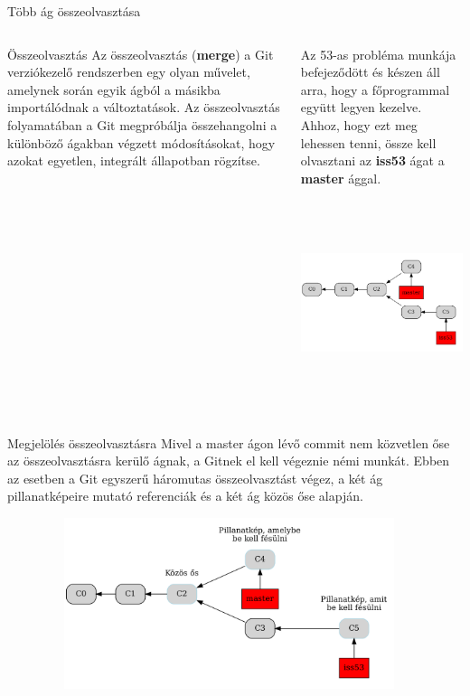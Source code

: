 \documentclass[english, aspectratio=169]{beamer}
\begin{document}
	\begin{frame}{Több ág összeolvasztása}
		\begin{columns}
			\begin{column}{0.4\textwidth}
				\begin{center}
					\begin{block}{Összeolvasztás}
						Az összeolvasztás (\textbf{merge}) a Git verziókezelő rendszerben egy olyan művelet, amelynek során egyik ágból a másikba importálódnak a változtatások. Az összeolvasztás folyamatában a Git megpróbálja összehangolni a különböző ágakban végzett módosításokat, hogy azokat egyetlen, integrált állapotban rögzítse.
					\end{block}
				\end{center}
			\end{column}
			\begin{column}{0.6\textwidth}
				Az 53-as probléma munkája befejeződött és készen áll arra, hogy a főprogrammal együtt legyen kezelve. Ahhoz, hogy ezt meg lehessen tenni, össze kell olvasztani az \textbf{iss53} ágat a \textbf{master} ággal.
				\begin{center}
					\includegraphics[height=6cm, width=8cm, keepaspectratio]{graphs/git_15.png}
				\end{center}
			\end{column}
		\end{columns}
	\end{frame}
	
	\begin{frame}{Megjelölés összeolvasztásra}
		Mivel a master ágon lévő commit nem közvetlen őse az összeolvasztásra kerülő ágnak, a Gitnek el kell végeznie némi munkát. Ebben az esetben a Git egyszerű háromutas összeolvasztást végez, a két ág pillanatképeire mutató referenciák és a két ág közös őse alapján.
		\begin{center}
			\includegraphics[height=5cm, width=13cm, keepaspectratio]{graphs/git_16.png}
		\end{center}
	\end{frame}
	
\end{document}
